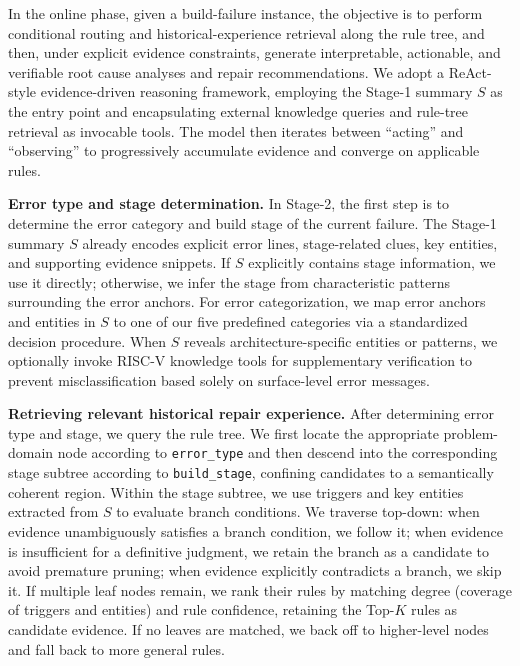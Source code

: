 \documentclass[sigconf]{acmart}
\begin{document}
In the online phase, given a build-failure instance, the objective is to perform conditional routing and historical-experience retrieval along the rule tree, and then, under explicit evidence constraints, generate interpretable, actionable, and verifiable root cause analyses and repair recommendations. We adopt a ReAct-style evidence-driven reasoning framework, employing the Stage-1 summary $S$ as the entry point and encapsulating external knowledge queries and rule-tree retrieval as invocable tools. The model then iterates between ``acting'' and ``observing'' to progressively accumulate evidence and converge on applicable rules.

\textbf{Error type and stage determination.} In Stage-2, the first step is to determine the error category and build stage of the current failure. The Stage-1 summary $S$ already encodes explicit error lines, stage-related clues, key entities, and supporting evidence snippets. If $S$ explicitly contains stage information, we use it directly; otherwise, we infer the stage from characteristic patterns surrounding the error anchors. For error categorization, we map error anchors and entities in $S$ to one of our five predefined categories via a standardized decision procedure. When $S$ reveals architecture-specific entities or patterns, we optionally invoke RISC-V knowledge tools for supplementary verification to prevent misclassification based solely on surface-level error messages.

\textbf{Retrieving relevant historical repair experience.} After determining error type and stage, we query the rule tree. We first locate the appropriate problem-domain node according to \texttt{error\_type} and then descend into the corresponding stage subtree according to \texttt{build\_stage}, confining candidates to a semantically coherent region. Within the stage subtree, we use triggers and key entities extracted from $S$ to evaluate branch conditions. We traverse top-down: when evidence unambiguously satisfies a branch condition, we follow it; when evidence is insufficient for a definitive judgment, we retain the branch as a candidate to avoid premature pruning; when evidence explicitly contradicts a branch, we skip it. If multiple leaf nodes remain, we rank their rules by matching degree (coverage of triggers and entities) and rule confidence, retaining the Top-$K$ rules as candidate evidence. If no leaves are matched, we back off to higher-level nodes and fall back to more general rules.
\end{document}
